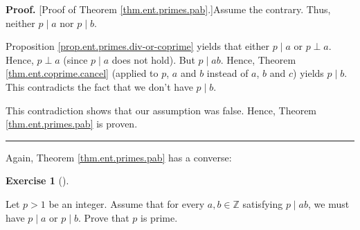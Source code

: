 \documentclass[numbers=enddot,12pt,final,onecolumn,notitlepage]{scrartcl}%
\newcounter{exer}
\numberwithin{exer}{subsection}
\theoremstyle{definition}
\newtheorem{exmp}[exer]{Exercise}
\newenvironment{exercise}[1][]
{\begin{exmp}[#1]\begin{leftbar}}
{\end{leftbar}\end{exmp}}
\newenvironment{proof}[1][Proof]{\noindent\textbf{#1.} }{\ \rule{0.5em}{0.5em}}
\begin{document}
\begin{proof}
[Proof of Theorem \ref{thm.ent.primes.pab}.]Assume the contrary. Thus, neither
$p\mid a$ nor $p\mid b$.

Proposition \ref{prop.ent.primes.div-or-coprime} yields that either $p\mid a$
or $p\perp a$. Hence, $p\perp a$ (since $p\mid a$ does not hold). But $p\mid
ab$. Hence, Theorem \ref{thm.ent.coprime.cancel} (applied to $p$, $a$ and $b$
instead of $a$, $b$ and $c$) yields $p\mid b$. This contradicts the fact that
we don't have $p\mid b$.

This contradiction shows that our assumption was false. Hence, Theorem
\ref{thm.ent.primes.pab} is proven.
\end{proof}

Again, Theorem \ref{thm.ent.primes.pab} has a converse:

\begin{exercise}
\label{exe.ent.primes.pab-conv}Let $p>1$ be an integer. Assume that for every
$a,b\in\mathbb{Z}$ satisfying $p\mid ab$, we must have $p\mid a$ or $p\mid b$.
Prove that $p$ is prime.
\end{exercise}
\end{document}
